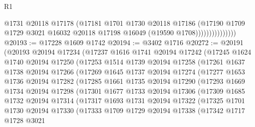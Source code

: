 \begin{lexlean}{R1}
\begin{coremodule}
                            @1731
                            @20118
                            @17178
                            (@17181
                              @1701
                              @1730
                              @20118
                              @17186
                              (@17190
                                @1709
                                @1729
                                @3021
                                @16032
                                @20118
                                @17198
                                @16049
                                (@19590 @1708)))))))))))))))
@20193 := @17228 @1609 @1742
@20194 := @3402 @1716
@20272 := @20191
    (@20193
      @20194
      @17234
      (@17237
        @1616
        @1741
        @20194
        @17242
        (@17245
          @1624
          @1740
          @20194
          @17250
          (@17253
            @1514
            @1739
            @20194
            @17258
            (@17261
              @1637
              @1738
              @20194
              @17266
              (@17269
                @1645
                @1737
                @20194
                @17274
                (@17277
                  @1653
                  @1736
                  @20194
                  @17282
                  (@17285
                    @1661
                    @1735
                    @20194
                    @17290
                    (@17293
                      @1669
                      @1734
                      @20194
                      @17298
                      (@17301
                        @1677
                        @1733
                        @20194
                        @17306
                        (@17309
                          @1685
                          @1732
                          @20194
                          @17314
                          (@17317
                            @1693
                            @1731
                            @20194
                            @17322
                            (@17325
                              @1701
                              @1730
                              @20194
                              @17330
                              (@17333
                                @1709
                                @1729
                                @20194
                                @17338
                                (@17342
                                  @1717
                                  @1728
                                  @3021

\end{coremodule}
\end{lexlean}
